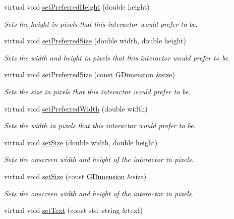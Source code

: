 \begin{DoxyCompactItemize}
virtual void \mbox{\hyperlink{classGInteractor_a1ab987704fce32098706c6f00fb08218}{set\+Preferred\+Height}} (double height)
\begin{DoxyCompactList}\small\item\em Sets the height in pixels that this interactor would prefer to be. \end{DoxyCompactList}\item 
virtual void \mbox{\hyperlink{classGInteractor_a042c5ae19430d765ef552371cae3632c}{set\+Preferred\+Size}} (double width, double height)
\begin{DoxyCompactList}\small\item\em Sets the width and height in pixels that this interactor would prefer to be. \end{DoxyCompactList}\item 
virtual void \mbox{\hyperlink{classGInteractor_aa22d9be4bc0e078bb0ea69b0fc9d7c75}{set\+Preferred\+Size}} (const \mbox{\hyperlink{structGDimension}{G\+Dimension}} \&size)
\begin{DoxyCompactList}\small\item\em Sets the size in pixels that this interactor would prefer to be. \end{DoxyCompactList}\item 
virtual void \mbox{\hyperlink{classGInteractor_a3db429ab2fa52efd187eec0ed8cdd9f2}{set\+Preferred\+Width}} (double width)
\begin{DoxyCompactList}\small\item\em Sets the width in pixels that this interactor would prefer to be. \end{DoxyCompactList}\item 
virtual void \mbox{\hyperlink{classGInteractor_aca25d49481f9bf5fc8f7df4c086c4ce7}{set\+Size}} (double width, double height)
\begin{DoxyCompactList}\small\item\em Sets the onscreen width and height of the interactor in pixels. \end{DoxyCompactList}\item 
virtual void \mbox{\hyperlink{classGInteractor_ae2b628228f192c2702c4ce941b2af68f}{set\+Size}} (const \mbox{\hyperlink{structGDimension}{G\+Dimension}} \&size)
\begin{DoxyCompactList}\small\item\em Sets the onscreen width and height of the interactor in pixels. \end{DoxyCompactList}\item 
virtual void \mbox{\hyperlink{classGBrowserPane_ac1ae51949d41ee9054634be5967d91b8}{set\+Text}} (const std\+::string \&text)

\end{DoxyCompactItemize}
